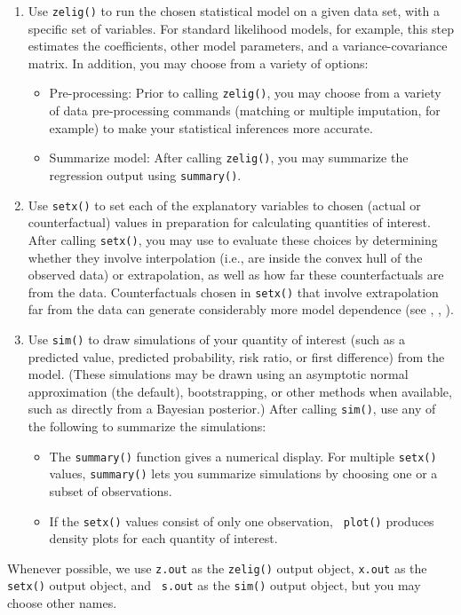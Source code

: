 \begin{enumerate}
\item Use \texttt{zelig()} to run the chosen statistical model on a
given data set, with a specific set of variables.  For standard
likelihood models, for example, this step estimates the coefficients,
other model parameters, and a variance-covariance matrix.  In
addition, you may choose from a variety of options:
\begin{itemize} 
\item Pre-processing:  Prior to calling {\tt zelig()}, you may
  choose from a variety of data pre-processing commands (matching or
  multiple imputation, for example) to make your statistical
  inferences more accurate. 
\item Summarize model: After calling {\tt zelig()}, you may summarize
the regression output using {\tt summary()}.  
\end{itemize}
\item Use \texttt{setx()} to set each of the explanatory variables to
  chosen (actual or counterfactual) values in preparation for
  calculating quantities of interest.  After calling {\tt setx()}, you
  may use  to evaluate these choices by
  determining whether they involve interpolation (i.e., are inside the
  convex hull of the observed data) or extrapolation, as well as how
  far these counterfactuals are from the data.  Counterfactuals chosen
  in \texttt{setx()} that involve extrapolation far from the data can
  generate considerably more model dependence (see \cite{KinZen06a},
  \cite{KinZen06b}, \cite{StoKinZen06}).
\item Use \texttt{sim()} to draw simulations of your quantity of
  interest (such as a predicted value, predicted probability, risk
  ratio, or first difference) from the model.  (These simulations may
  be drawn using an asymptotic normal approximation (the default),
  bootstrapping, or other methods when available, such as directly
  from a Bayesian posterior.)  After calling {\tt sim()}, use any of
the following to summarize the simulations:
\begin{itemize}
\item The {\tt summary()} function gives a numerical display. For
multiple {\tt setx()} values, {\tt summary()} lets you summarize
simulations by choosing one or a subset of observations.
\item If the {\tt setx()} values consist of only one observation, {\tt
plot()} produces density plots for each quantity of interest.  
\end{itemize}
\end{enumerate}
Whenever possible, we use {\tt z.out} as the {\tt zelig()} output
object, \texttt{x.out} as the \texttt{setx()} output object, and {\tt
s.out} as the {\tt sim()} output object, but you may choose other
names.

